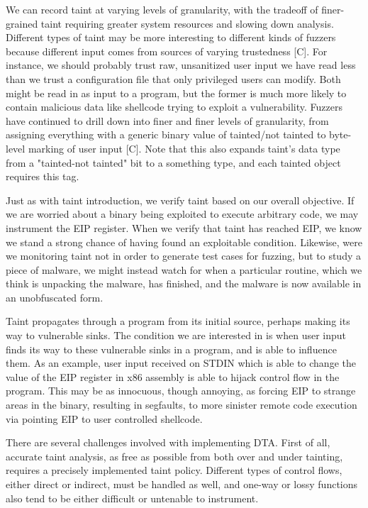 \documentclass[11pt,expanded,copyright]{fsuthesis}
\begin{document}
We can record taint at varying levels of granularity, with the tradeoff of finer-grained taint requiring greater system resources and slowing down analysis. Different types of taint may be more interesting to different kinds of fuzzers because different input comes from sources of varying trustedness [C]. For instance, we should probably trust raw, unsanitized user input we have read less than we trust a configuration file that only privileged users can modify. Both might be read in as input to a program, but the former is much more likely to contain malicious data like shellcode trying to exploit a vulnerability. Fuzzers have continued to drill down into finer and finer levels of granularity, from assigning everything with a generic binary value of tainted/not tainted to byte-level marking of user input [C]. Note that this also expands taint's data type from a "tainted-not tainted" bit to a something type, and each tainted object requires this tag.

Just as with taint introduction, we verify taint based on our overall objective. If we are worried about a binary being exploited to execute arbitrary code, we may instrument the EIP register. When we verify that taint has reached EIP, we know we stand a strong chance of having found an exploitable condition. Likewise, were we monitoring taint not in order to generate test cases for fuzzing, but to study a piece of malware, we might instead watch for when a particular routine, which we think is unpacking the malware, has finished, and the malware is now available in an unobfuscated form.

Taint propagates through a program from its initial source, perhaps making its way to vulnerable sinks. The condition we are interested in is when user input finds its way to these vulnerable sinks in a program, and is able to influence them. As an example, user input received on STDIN which is able to change the value of the EIP register in x86 assembly is able to hijack control flow in the program. This may be as innocuous, though annoying, as forcing EIP to strange areas in the binary, resulting in segfaults, to more sinister remote code execution via pointing EIP to user controlled shellcode.

There are several challenges involved with implementing DTA. First of all, accurate taint analysis, as free as possible from both over and under tainting, requires a precisely implemented taint policy. Different types of control flows, either direct or indirect, must be handled as well, and one-way or lossy functions also tend to be either difficult or untenable to instrument.
\end{document}
